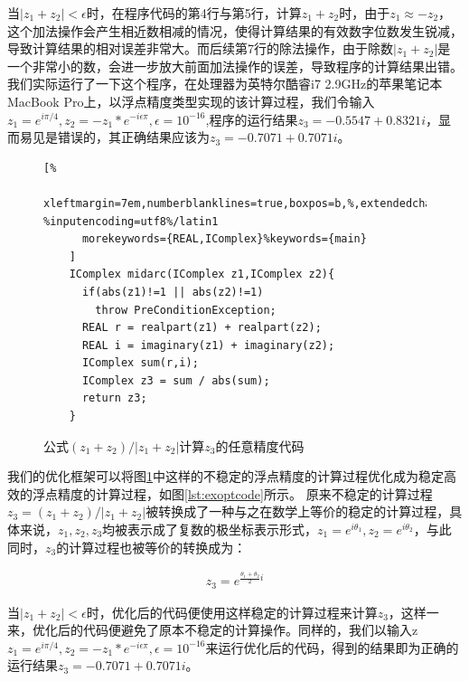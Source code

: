 当$|z_1+z_2| < \epsilon$时，在程序代码的第4行与第5行，计算$z_1+z_2$时，由于$z_1 \approx -z_2$，这个加法操作会产生相近数相减的情况\cite{NumericalAnalysis}，使得计算结果的有效数字位数发生锐减，导致计算结果的相对误差非常大。而后续第7行的除法操作，由于除数$|z_1+z_2|$是一个非常小的数，会进一步放大前面加法操作的误差，导致程序的计算结果出错。我们实际运行了一下这个程序，在处理器为英特尔酷睿i7 2.9GHz的苹果笔记本MacBook Pro上，以浮点精度类型实现的该计算过程，我们令输入$z_1=e^{i\pi/4},z_2=-z_1*e^{-i \epsilon \pi},\epsilon=10^{-16}$,程序的运行结果$z_3=-0.5547+0.8321i$，显而易见是错误的，其正确结果应该为$z_3=-0.7071+0.7071i$。

\begin{figure}[thbp]
    \begin{lstlisting}[%
      xleftmargin=7em,numberblanklines=true,boxpos=b,%,extendedchars=\true, %inputencoding=utf8%/latin1
      morekeywords={REAL,IComplex}%keywords={main}
    ]
    IComplex midarc(IComplex z1,IComplex z2){
      if(abs(z1)!=1 || abs(z2)!=1)
        throw PreConditionException;
      REAL r = realpart(z1) + realpart(z2);   
      REAL i = imaginary(z1) + imaginary(z2); 
      IComplex sum(r,i);
      IComplex z3 = sum / abs(sum);           
      return z3;
    }
    \end{lstlisting}
    \caption{公式$(z_1+z_2)/|z_1+z_2|$计算$z_3$的任意精度代码}
    \label{lst:exoricode}
\end{figure}
    
我们的优化框架可以将图\ref{lst:exoricode}中这样的不稳定的浮点精度的计算过程优化成为稳定高效的浮点精度的计算过程，如图\ref{lst:exoptcode}所示。 原来不稳定的计算过程$z_3=(z_1+z_2)/|z_1+z_2|$被转换成了一种与之在数学上等价的稳定的计算过程，具体来说，$z_1,z_2,z_3$均被表示成了复数的极坐标表示形式，$z_1=e^{i\theta_1},z_2=e^{i\theta_2}$，与此同时，$z_3$的计算过程也被等价的转换成为：

\begin{gather*}\label{eq:optex}
    z_3=e^{\frac{\theta_1+\theta_2}{2}i}
\end{gather*}

当$|z_1+z_2|<\epsilon$时，优化后的代码便使用这样稳定的计算过程来计算$z_3$，这样一来，优化后的代码便避免了原本不稳定的计算操作。同样的，我们以输入z$z_1=e^{i\pi/4},z_2=-z_1*e^{-i \epsilon \pi},\epsilon=10^{-16}$来运行优化后的代码，得到的结果即为正确的运行结果$z_3=-0.7071+0.7071i$。

